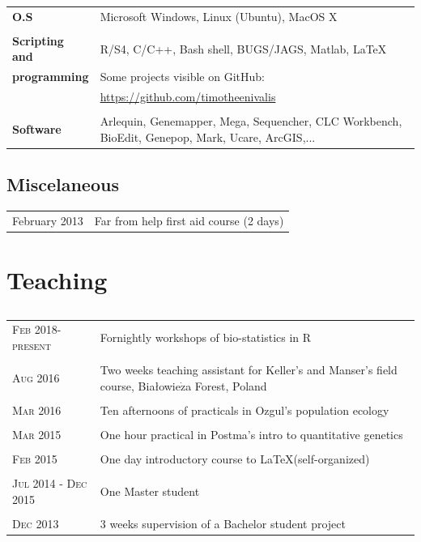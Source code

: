 \documentclass[a4paper,10pt]{article} %
\begin{document}
\begin{tabular}{p{4cm}|p{11cm}}
\hfill \textbf{O.S} & Microsoft Windows, Linux (Ubuntu), MacOS X\\
\multicolumn{2}{c}{} \\
\hfill \textbf{Scripting and} & R/S4, C/C++, Bash shell, BUGS/JAGS, Matlab, \LaTeX\\
\hfill \textbf{programming} & Some projects visible on GitHub: \\
										& \url{https://github.com/timotheenivalis}\\
\multicolumn{2}{c}{} \\
\hfill \textbf{Software} & Arlequin, Genemapper, Mega, Sequencher, CLC Workbench, BioEdit, Genepop, Mark, Ucare, ArcGIS,...\\
\end{tabular}

\subsection*{Miscelaneous}
\begin{tabular}{p{4cm}|p{11cm}}
\hfill February 2013 & Far from help first aid course (2 days)\\
\end{tabular}
\section*{Teaching}
\subsection*{}
\begin{tabular}{p{4cm}|p{11cm}}
\hfill \textsc{Feb 2018-present} & Fornightly workshops of bio-statistics in R\\
\multicolumn{2}{c}{} \\
\hfill \textsc{Aug 2016} & Two weeks teaching assistant for Keller's and Manser's field course, Bia{\l}owie$\dot{\mathrm{z}}$a Forest, Poland\\
\multicolumn{2}{c}{} \\
\hfill \textsc{Mar 2016} & Ten afternoons of practicals in Ozgul's population ecology \\
\multicolumn{2}{c}{} \\
\hfill \textsc{Mar 2015} & One hour practical in Postma's intro to quantitative genetics\\
\multicolumn{2}{c}{} \\
\hfill \textsc{Feb 2015} & One day introductory course to \LaTeX (self-organized)\\
\multicolumn{2}{c}{} \\
\hfill \textsc{Jul 2014 - Dec 2015} & One Master student\\
\multicolumn{2}{c}{} \\
\hfill \textsc{Dec 2013} & 3 weeks supervision of a Bachelor student project\\
\end{tabular}
\end{document}
